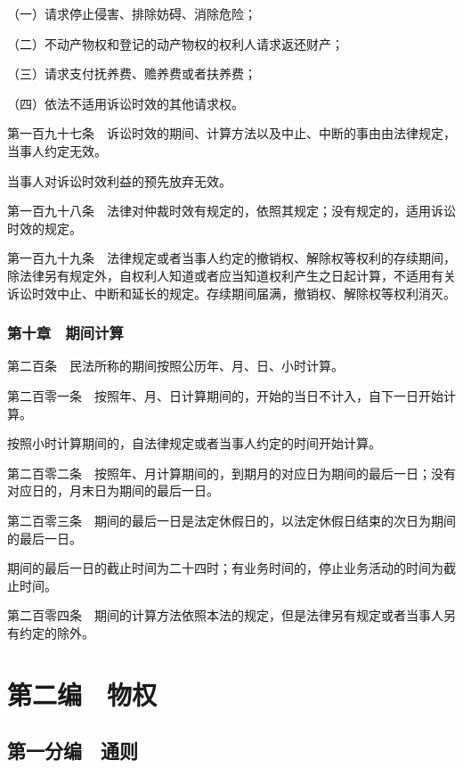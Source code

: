 \documentclass[UTF8,12pt,a4paper]{ctexbook}
\begin{document}
（一）请求停止侵害、排除妨碍、消除危险；

（二）不动产物权和登记的动产物权的权利人请求返还财产；

（三）请求支付抚养费、赡养费或者扶养费；

（四）依法不适用诉讼时效的其他请求权。

第一百九十七条　诉讼时效的期间、计算方法以及中止、中断的事由由法律规定，当事人约定无效。

当事人对诉讼时效利益的预先放弃无效。

第一百九十八条　法律对仲裁时效有规定的，依照其规定；没有规定的，适用诉讼时效的规定。

第一百九十九条　法律规定或者当事人约定的撤销权、解除权等权利的存续期间，除法律另有规定外，自权利人知道或者应当知道权利产生之日起计算，不适用有关诉讼时效中止、中断和延长的规定。存续期间届满，撤销权、解除权等权利消灭。

\section*{第十章　期间计算}

第二百条　民法所称的期间按照公历年、月、日、小时计算。

第二百零一条　按照年、月、日计算期间的，开始的当日不计入，自下一日开始计算。

按照小时计算期间的，自法律规定或者当事人约定的时间开始计算。

第二百零二条　按照年、月计算期间的，到期月的对应日为期间的最后一日；没有对应日的，月末日为期间的最后一日。

第二百零三条　期间的最后一日是法定休假日的，以法定休假日结束的次日为期间的最后一日。

期间的最后一日的截止时间为二十四时；有业务时间的，停止业务活动的时间为截止时间。

第二百零四条　期间的计算方法依照本法的规定，但是法律另有规定或者当事人另有约定的除外。



\cleardoublepage
{}
\part*{第二编　物权}

\cleardoublepage
{}
\chapter*{第一分编　通则}
\end{document}
